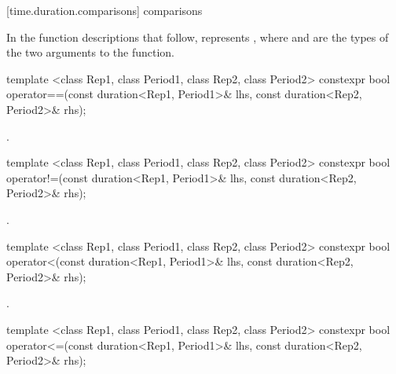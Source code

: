 [time.duration.comparisons]{ comparisons}

\pnum
In the function descriptions that follow,  represents
, where  and  are the types of
the two arguments to the function.

%
%
\begin{itemdecl}
template <class Rep1, class Period1, class Rep2, class Period2>
  constexpr bool operator==(const duration<Rep1, Period1>& lhs, const duration<Rep2, Period2>& rhs);
\end{itemdecl}

\begin{itemdescr}
\pnum
\returns {}.
\end{itemdescr}

%
%
\begin{itemdecl}
template <class Rep1, class Period1, class Rep2, class Period2>
  constexpr bool operator!=(const duration<Rep1, Period1>& lhs, const duration<Rep2, Period2>& rhs);
\end{itemdecl}

\begin{itemdescr}
\pnum
\returns {}.
\end{itemdescr}

%
%
\begin{itemdecl}
template <class Rep1, class Period1, class Rep2, class Period2>
  constexpr bool operator<(const duration<Rep1, Period1>& lhs, const duration<Rep2, Period2>& rhs);
\end{itemdecl}

\begin{itemdescr}
\pnum
\returns {}.
\end{itemdescr}

%
%
\begin{itemdecl}
template <class Rep1, class Period1, class Rep2, class Period2>
  constexpr bool operator<=(const duration<Rep1, Period1>& lhs, const duration<Rep2, Period2>& rhs);
\end{itemdecl}

